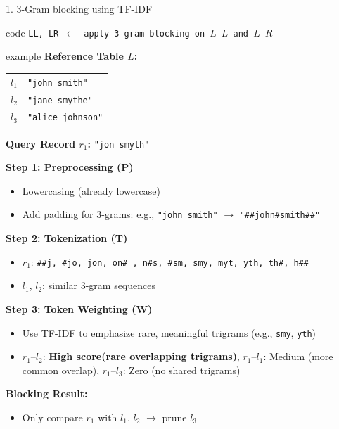 \documentclass[8pt]{beamer} %
\begin{document}
\begin{frame}{1. 3-Gram blocking using TF-IDF}
	

	\begin{beamercolorbox}[rounded=true, shadow=true, leftskip=1em, rightskip=1em]{code}
		\texttt{LL, LR $\leftarrow$ apply 3-gram blocking on $L–L$ and $L–R$}
	\end{beamercolorbox}
	
	
	\vspace{0.5em}
	

	\begin{beamercolorbox}[rounded=true, shadow=true, leftskip=1em, rightskip=1em]{example}
		\textbf{Reference Table $L$:}
		\begin{tabular}{ll}
			$l_1$ & \texttt{"john smith"} \\
			$l_2$ & \texttt{"jane smythe"} \\
			$l_3$ & \texttt{"alice johnson"}
		\end{tabular}
		
		\vspace{0.5em}
		\textbf{Query Record $r_1$:} \texttt{"jon smyth"}
		
		\vspace{0.5em}
		\textbf{Step 1: Preprocessing (P)}
		\begin{itemize}
			\item Lowercasing (already lowercase)
			\item Add padding for 3-grams: e.g., \texttt{"john smith"} $\rightarrow$ \texttt{"\#\#john\#smith\#\#"}
		\end{itemize}
		
		\vspace{0.5em}
		\textbf{Step 2: Tokenization (T)}
		\begin{itemize}
			\item $r_1$: \texttt{\#\#j, \#jo, jon, on\# , n\#s, \#sm, smy, myt, yth, th\#, h\#\#}
			\item $l_1$, $l_2$: similar 3-gram sequences
		\end{itemize}
		
		\vspace{0.5em}
		\textbf{Step 3: Token Weighting (W)}
		\begin{itemize}
			\item Use TF-IDF to emphasize rare, meaningful trigrams (e.g., \texttt{smy}, \texttt{yth})
			\item $r_1$–$l_2$: \textbf{High score(rare overlapping trigrams)}, $r_1$–$l_1$: Medium (more common overlap), $r_1$–$l_3$: Zero (no shared trigrams)
		\end{itemize}
		
		\vspace{0.5em}
		\textbf{Blocking Result:}
		\begin{itemize}
			\item Only compare $r_1$ with $l_1$, $l_2$ $\rightarrow$ prune $l_3$
		\end{itemize}
	\end{beamercolorbox}
	
	
\end{frame}
\end{document}
